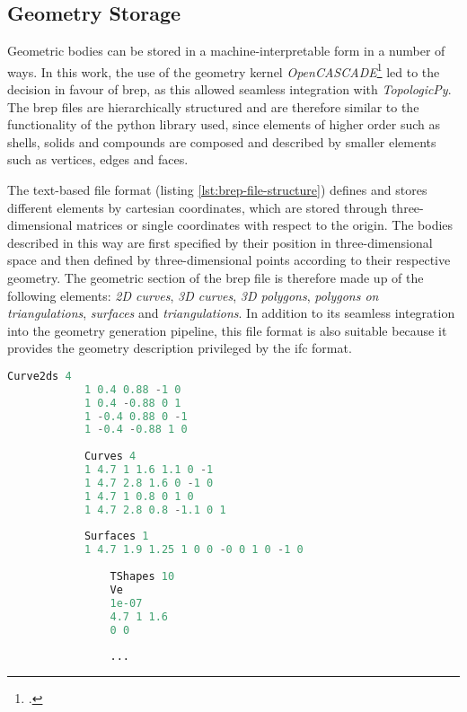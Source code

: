 \documentclass[a4paper, 12pt]{report}
\begin{document}
\subsection{Geometry Storage}\label{subsec:geometry-storage}

Geometric bodies can be stored in a machine-interpretable form in a number of ways. In this work, the use of the geometry kernel \textit{OpenCASCADE}\footcite{slyadnev2017cad} led to the decision in favour of \acrlong{brep}, as this allowed seamless integration with \textit{TopologicPy}. The \acrshort{brep} files are hierarchically structured and are therefore similar to the functionality of the \Gls{python} library used, since elements of higher order such as shells, solids and compounds are composed and described by smaller elements such as vertices, edges and faces.

The text-based file format (listing \ref{lst:brep-file-structure}) defines and stores different elements by \Gls{cartesian coordinates}, which are stored through three-dimensional matrices or single coordinates with respect to the origin. The bodies described in this way are first specified by their position in three-dimensional space and then defined by three-dimensional points according to their respective geometry. The geometric section of the \acrshort{brep} file is therefore made up of the following elements: \textit{2D curves}, \textit{3D curves}, \textit{3D polygons}, \textit{polygons on triangulations}, \textit{surfaces} and \textit{triangulations}. In addition to its seamless integration into the geometry generation pipeline, this file format is also suitable because it provides the geometry description privileged by the \acrshort{ifc} format.

\begin{lstlisting}[language=python, caption={Brep File Structure}, label={lst:brep-file-structure}, captionpos=b]
            Curve2ds 4
            1 0.4 0.88 -1 0 
            1 0.4 -0.88 0 1 
            1 -0.4 0.88 0 -1 
            1 -0.4 -0.88 1 0 
            
            Curves 4
            1 4.7 1 1.6 1.1 0 -1 
            1 4.7 2.8 1.6 0 -1 0 
            1 4.7 1 0.8 0 1 0 
            1 4.7 2.8 0.8 -1.1 0 1 
            
            Surfaces 1
            1 4.7 1.9 1.25 1 0 0 -0 0 1 0 -1 0
            
                TShapes 10
                Ve
                1e-07
                4.7 1 1.6
                0 0
             
                ...
\end{lstlisting}
\end{document}
